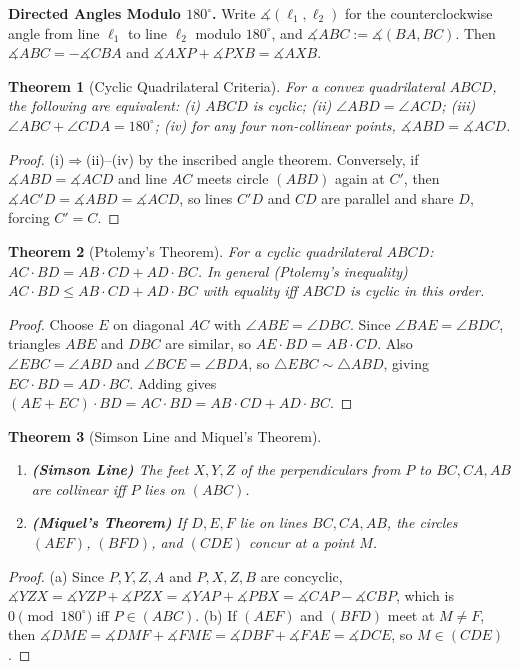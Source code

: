 \documentclass[11pt]{article}
\theoremstyle{plain}
\newtheorem{theorem}{Theorem}[section]
\theoremstyle{definition}
\newcommand{\dang}{\measuredangle}
\begin{document}
\textbf{Directed Angles Modulo $180^\circ$.} Write $\dang(\ell_1, \ell_2)$ for the counterclockwise angle from line $\ell_1$ to line $\ell_2$ modulo $180^\circ$, and $\dang ABC := \dang(BA, BC)$. Then $\dang ABC = -\dang CBA$ and $\dang AXP + \dang PXB = \dang AXB$.

\begin{theorem}[Cyclic Quadrilateral Criteria]
For a convex quadrilateral $ABCD$, the following are equivalent:
(i) $ABCD$ is cyclic; (ii) $\angle ABD = \angle ACD$; (iii) $\angle ABC + \angle CDA = 180^\circ$; (iv) for any four non-collinear points, $\dang ABD = \dang ACD$.
\end{theorem}
\begin{proof}
(i)$\Rightarrow$(ii)--(iv) by the inscribed angle theorem. Conversely, if $\dang ABD = \dang ACD$ and line $AC$ meets circle $(ABD)$ again at $C'$, then $\dang AC'D = \dang ABD = \dang ACD$, so lines $C'D$ and $CD$ are parallel and share $D$, forcing $C' = C$.
\end{proof}

\begin{theorem}[Ptolemy's Theorem]
For a cyclic quadrilateral $ABCD$: $AC \cdot BD = AB\cdot CD + AD \cdot BC$.
In general (Ptolemy's inequality) $AC\cdot BD \le AB\cdot CD + AD\cdot BC$
with equality iff $ABCD$ is cyclic in this order.
\end{theorem}
\begin{proof}
Choose $E$ on diagonal $AC$ with $\angle ABE = \angle DBC$. Since
$\angle BAE = \angle BDC$, triangles $ABE$ and
$DBC$ are similar, so $AE\cdot BD = AB\cdot CD$. Also $\angle EBC = \angle ABD$ and
$\angle BCE = \angle BDA$, so $\triangle EBC \sim \triangle ABD$, giving $EC \cdot BD = AD \cdot BC$.
Adding gives $(AE+EC)\cdot BD = AC\cdot BD = AB\cdot CD + AD\cdot BC$.
\end{proof}

\begin{theorem}[Simson Line and Miquel's Theorem]
\leavevmode
\begin{enumerate}[label=(\alph*)]
\item \textbf{(Simson Line)} The feet $X, Y, Z$ of the perpendiculars from $P$ to $BC, CA, AB$ are collinear iff $P$ lies on $(ABC)$.
\item \textbf{(Miquel's Theorem)} If $D, E, F$ lie on lines $BC, CA, AB$, the circles $(AEF)$, $(BFD)$, and $(CDE)$ concur at a point $M$.
\end{enumerate}
\end{theorem}
\begin{proof}
(a) Since $P,Y,Z,A$ and $P,X,Z,B$ are concyclic, $\dang YZX = \dang YZP + \dang PZX = \dang YAP + \dang PBX = \dang CAP - \dang CBP$, which is $0 \pmod{180^\circ}$ iff $P \in (ABC)$.
(b) If $(AEF)$ and $(BFD)$ meet at $M \ne F$, then $\dang DME = \dang DMF + \dang FME = \dang DBF + \dang FAE = \dang DCE$, so $M \in (CDE)$.
\end{proof}
\end{document}
